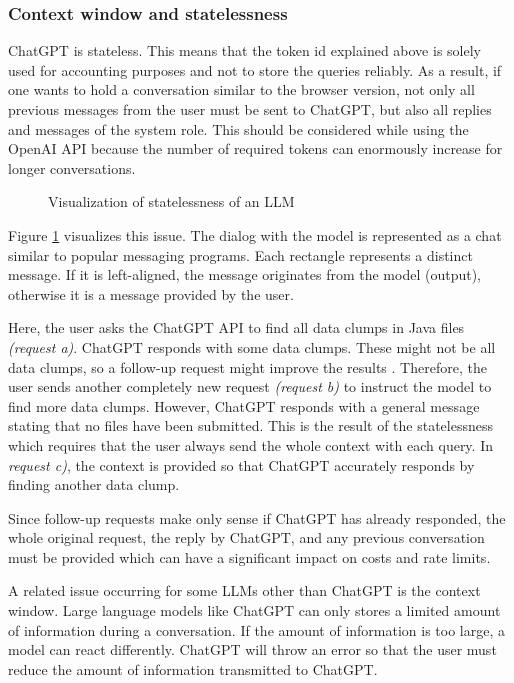 \subsubsection{Context window and statelessness}

ChatGPT is stateless. This means that the token id explained above is solely used for accounting purposes and not to store the queries reliably. As a result, if one wants to hold a conversation similar to the browser version,  not only all previous messages from the user must be sent to ChatGPT, but also all replies and messages of the system role. This should be considered while using the OpenAI \ac{API} because the number of required tokens can enormously increase for longer conversations.

\begin{figure}
    \centering
    
    \caption{Visualization of statelessness of an \ac{LLM}}
    \label{fig:chatgpt_stateless}
\end{figure}


Figure \ref{fig:chatgpt_stateless} visualizes this issue. The dialog with the model is represented as a chat similar to popular messaging programs. Each rectangle represents a distinct message. If it is left-aligned, the message originates from the model (output), otherwise it is a message provided by the user. 

Here, the user asks the ChatGPT API to find all data clumps in Java files \textit{(request a)}. ChatGPT responds with some data clumps. These might not be all data clumps, so a follow-up request might improve the results \cite{10062688}. Therefore, the user sends another completely new request \textit{(request b)} to instruct the model to find more data clumps. However, ChatGPT responds with a general message stating that no files have been submitted. This is the result of the statelessness which requires that the user always send the whole context with each query. In \textit{request c)}, the context is provided so that ChatGPT accurately responds by finding another data clump.

Since follow-up requests make only sense if ChatGPT has already responded, the whole original request, the reply by ChatGPT, and any previous conversation must be provided which can have a significant impact on costs and rate limits. 

A related issue occurring for some \acp{LLM} other than ChatGPT is the context window. Large language models like ChatGPT can only stores a limited amount of information during a conversation. If the amount of information is too large,  a model can react differently. ChatGPT will throw an error so that the user must reduce the amount of information transmitted to ChatGPT.

